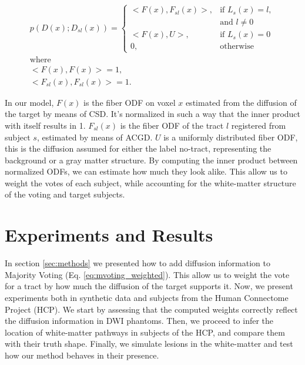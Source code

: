 \begin{equation}
\label{eq:inner_odf}
\begin{aligned}
    p(D(x) ; D_{sl}(x)) = 
    \begin{cases}
        <F(x), F_{sl}(x)>,& \text{if } L_s(x) = l,\\
                        & \text{and } l \neq 0 \\
        <F(x), U>,& \text{if } L_s(x) = 0 \\
        0,& \text{otherwise}
    \end{cases} \\
    \text{where} \\
    <F(x),F(x)> = 1,\\ < F_{sl}(x), F_{sl}(x)>=1.
\end{aligned}
\end{equation}

In our model, $F(x)$ is the fiber ODF on voxel $x$ estimated from the diffusion
of the target by means of CSD. It's normalized in such a way that the inner
product with itself results in 1. $F_{sl}(x)$ is the fiber ODF of the tract $l$
registered from subject $s$, estimated by means of ACGD. $U$ is a uniformly
distributed fiber ODF, this is the diffusion assumed for either the label 
no-tract, representing the background or a gray matter structure.
By computing the inner product between normalized ODFs, we can estimate how much
they look alike. This allow us to weight the votes of each subject, while
accounting for the white-matter structure of the voting and target subjects.

\section{Experiments and Results}
In section \ref{sec:methods} we presented how to add diffusion information to
Majority Voting (Eq. \ref{eq:mvoting_weighted}). This allow us to weight the
vote for a tract by how much the diffusion of the target supports it. Now, we present
experiments both in synthetic data and subjects from the Human Connectome 
Project (HCP). We start by assessing that the computed weights correctly reflect
the diffusion information in DWI phantoms. Then, we proceed to infer the location
of white-matter pathways in subjects of the HCP, and compare them with their
truth shape. Finally, we simulate lesions in the white-matter and test how our
method behaves in their presence.

